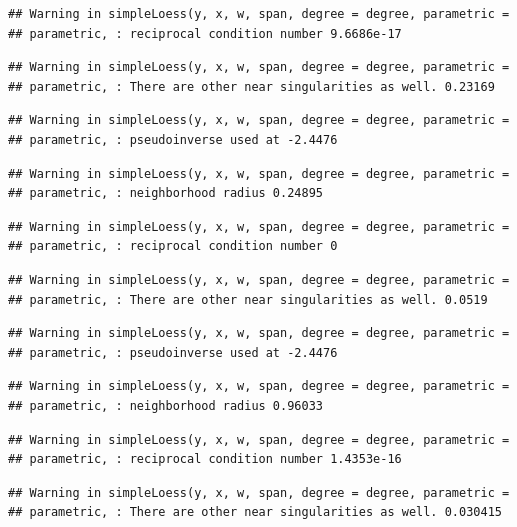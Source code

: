 \documentclass[]{article}
\begin{document}
\begin{verbatim}
## Warning in simpleLoess(y, x, w, span, degree = degree, parametric =
## parametric, : reciprocal condition number 9.6686e-17
\end{verbatim}

\begin{verbatim}
## Warning in simpleLoess(y, x, w, span, degree = degree, parametric =
## parametric, : There are other near singularities as well. 0.23169
\end{verbatim}

\begin{verbatim}
## Warning in simpleLoess(y, x, w, span, degree = degree, parametric =
## parametric, : pseudoinverse used at -2.4476
\end{verbatim}

\begin{verbatim}
## Warning in simpleLoess(y, x, w, span, degree = degree, parametric =
## parametric, : neighborhood radius 0.24895
\end{verbatim}

\begin{verbatim}
## Warning in simpleLoess(y, x, w, span, degree = degree, parametric =
## parametric, : reciprocal condition number 0
\end{verbatim}

\begin{verbatim}
## Warning in simpleLoess(y, x, w, span, degree = degree, parametric =
## parametric, : There are other near singularities as well. 0.0519
\end{verbatim}

\begin{verbatim}
## Warning in simpleLoess(y, x, w, span, degree = degree, parametric =
## parametric, : pseudoinverse used at -2.4476
\end{verbatim}

\begin{verbatim}
## Warning in simpleLoess(y, x, w, span, degree = degree, parametric =
## parametric, : neighborhood radius 0.96033
\end{verbatim}

\begin{verbatim}
## Warning in simpleLoess(y, x, w, span, degree = degree, parametric =
## parametric, : reciprocal condition number 1.4353e-16
\end{verbatim}

\begin{verbatim}
## Warning in simpleLoess(y, x, w, span, degree = degree, parametric =
## parametric, : There are other near singularities as well. 0.030415
\end{verbatim}
\end{document}
